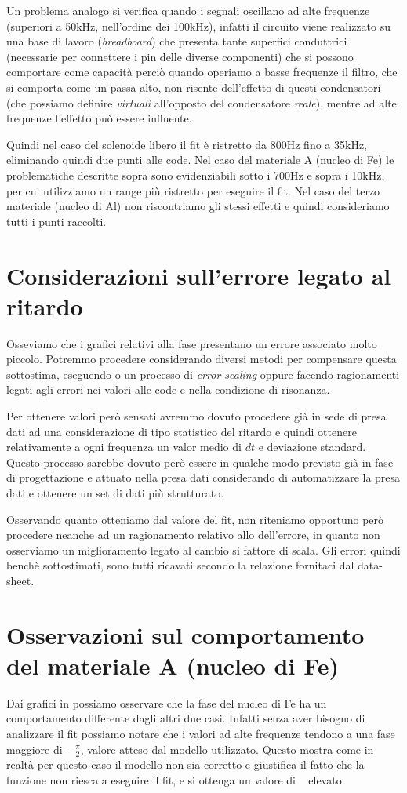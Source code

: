 \documentclass[
    rmp,
    floatfix,
    reprint, 
    superscriptaddress, 
    altaffilletter, 
    amsmath, 
    amssymb, 
    a4paper]{revtex4-2}
\begin{document}
Un problema analogo si verifica quando i segnali oscillano ad alte frequenze (superiori a 50kHz, nell'ordine dei 100kHz), infatti il circuito viene realizzato su una base di lavoro (\textit{breadboard}) che presenta tante superfici conduttrici (necessarie per connettere i pin delle diverse componenti) che si possono comportare come capacità perciò quando operiamo a basse frequenze il filtro, che si comporta come un passa alto, non risente dell'effetto di questi condensatori (che possiamo definire \textit{virtuali} all'opposto del condensatore \textit{reale}), mentre ad alte frequenze l'effetto può essere influente. 

Quindi nel caso del solenoide libero il fit è ristretto da 800Hz fino a 35kHz, eliminando quindi due punti alle code. Nel caso del materiale A (nucleo di Fe) le problematiche descritte sopra sono evidenziabili sotto i 700Hz e sopra i 10kHz, per cui utilizziamo un range più ristretto per eseguire il fit. Nel caso del terzo materiale (nucleo di Al) non riscontriamo gli stessi effetti e quindi consideriamo tutti i punti raccolti. 

\section*{Considerazioni sull'errore legato al ritardo}
Osseviamo che i grafici relativi alla fase presentano un errore associato molto piccolo. Potremmo procedere considerando diversi metodi per compensare questa sottostima, eseguendo o un processo di \textit{error scaling} oppure facendo ragionamenti legati agli errori nei valori alle code e nella condizione di risonanza. 

Per ottenere valori però sensati avremmo dovuto procedere già in sede di presa dati ad una considerazione di tipo statistico del ritardo e quindi ottenere relativamente a ogni frequenza un valor medio di $dt$ e deviazione standard. Questo processo sarebbe dovuto però essere in qualche modo previsto già in fase di progettazione e attuato nella presa dati considerando di automatizzare la presa dati e ottenere un set di dati più strutturato. 

Osservando quanto otteniamo dal valore del fit, non riteniamo opportuno però procedere neanche ad un ragionamento relativo allo  dell'errore, in quanto non osserviamo un miglioramento legato al cambio si fattore di scala. Gli errori quindi benchè sottostimati, sono tutti ricavati secondo la relazione fornitaci dal data-sheet.


\section*{Osservazioni sul comportamento del materiale A (nucleo di F\lowercase{e})}
Dai grafici in  possiamo osservare che la fase del nucleo di Fe ha un comportamento differente dagli altri due casi. Infatti senza aver bisogno di analizzare il fit possiamo notare che i valori ad alte frequenze tendono a una fase maggiore di $-\frac{\pi}{2}$, valore atteso dal modello utilizzato. Questo mostra come in realtà per questo caso il modello non sia corretto e giustifica il fatto che la funzione non riesca a eseguire il fit, e si ottenga un valore di \ChiNdf~ elevato. 
\end{document}
